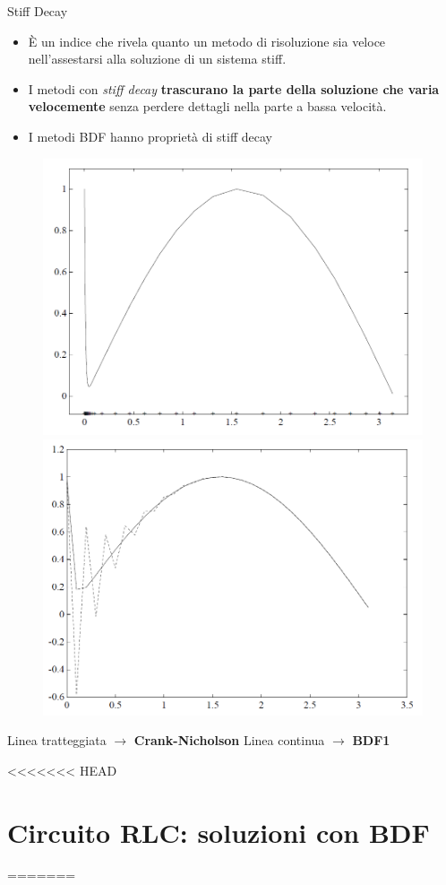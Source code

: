 \documentclass[aspectratio=169, 10pt, handout,usenames,dvipsnames]{beamer}
\begin{document}
    \begin{frame}{Stiff Decay}
        \medskip
        \medskip
        \begin{itemize}
        \item È un \alert{indice} che rivela quanto un metodo di risoluzione sia veloce nell’assestarsi alla soluzione di un sistema stiff.\\
        \item I metodi con \textit{stiff decay} \textbf{trascurano la parte della soluzione che
        varia velocemente} senza perdere dettagli nella parte a bassa velocità.
        \item I metodi BDF hanno proprietà di stiff decay
        \end{itemize}
        \begin{figure}
        \includegraphics[width=.4\linewidth]{fig9.png}
        \includegraphics[width=.4\linewidth]{fig8.png}
        \label{fig:stiff_decay}
    \end{figure}
        \begin{centering}
            Linea tratteggiata $\rightarrow$ \textbf{Crank-Nicholson} \space\space\space Linea continua $\rightarrow$ \textbf{BDF1}\\
        \end{centering}
    \end{frame}

<<<<<<< HEAD
\section{Circuito RLC: soluzioni con BDF}\label{sec:sec12}
=======
\end{document}

